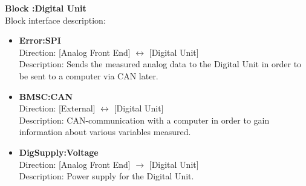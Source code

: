 \textbf{Block :Digital Unit}\\
Block interface description:
\begin{itemize}
	\item \textbf{Error:SPI}\\
	Direction: [Analog Front End] $\leftrightarrow$ [Digital Unit]\\
	Description: Sends the measured analog data to the Digital Unit in order to be sent to a computer via CAN later.
	\item \textbf{BMSC:CAN}\\
	Direction: [External] $\leftrightarrow$ [Digital Unit]\\
	Description: CAN-communication with a computer in order to gain information about various variables measured.
	\item \textbf{DigSupply:Voltage}\\
	Direction: [Analog Front End] $\rightarrow$ [Digital Unit]\\
	Description: Power supply for the Digital Unit.
\end{itemize}

